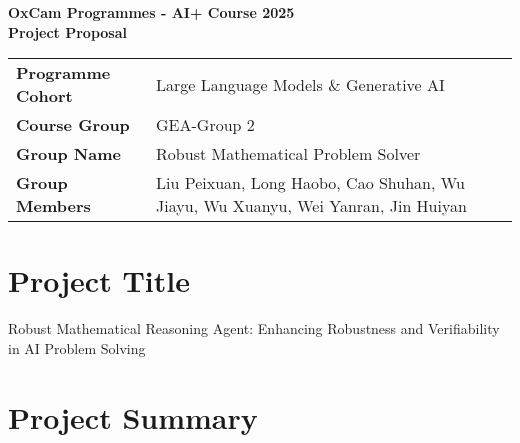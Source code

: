 \documentclass[a4paper,11pt]{article}
\begin{document}
\begin{center}
    \Huge\textbf{OxCam Programmes - AI+ Course 2025} \\
    \huge\textbf{Project Proposal}
\end{center}

\begin{center}
    \Large
    \begin{tabular}{>{\bfseries}p{6cm}p{10cm}}
        Programme Cohort & Large Language Models \& Generative AI \\
        Course Group & GEA-Group 2 \\
        Group Name & Robust Mathematical Problem Solver \\
        Group Members & Liu Peixuan, Long Haobo, Cao Shuhan, Wu Jiayu, Wu Xuanyu, Wei Yanran, Jin Huiyan \\
    \end{tabular}
\end{center}

\vspace{1em}

\section*{Project Title}
Robust Mathematical Reasoning Agent: Enhancing Robustness and Verifiability in AI Problem Solving

\section*{Project Summary}
\end{document}
